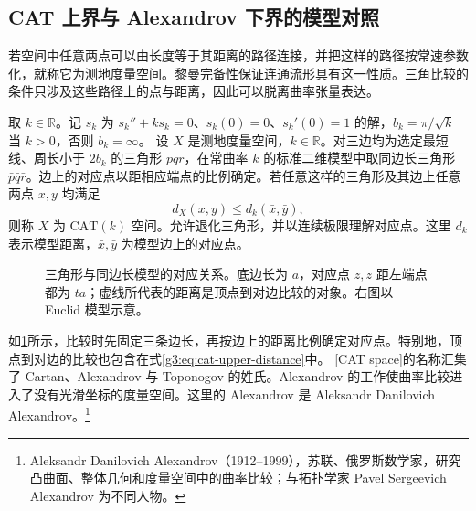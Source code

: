 \subsection{CAT 上界与 Alexandrov 下界的模型对照}
\label{g3:subsec:0904:03}

若空间中任意两点可以由长度等于其距离的路径连接，并把这样的路径按常速参数化，就称它为测地度量空间。黎曼完备性保证连通流形具有这一性质。三角比较的条件只涉及这些路径上的点与距离，因此可以脱离曲率张量表达。

\begin{definition}\label{g3:def:cat-comparison}
	取 \(k\in\mathbb R\)。记 \(s_k\) 为 \(s_k''+ks_k=0\)、\(s_k(0)=0\)、\(s_k'(0)=1\) 的解，\(b_k=\pi/\sqrt k\) 当 \(k>0\)，否则 \(b_k=\infty\)。
	设 \(X\) 是测地度量空间，\(k\in\mathbb R\)。对三边均为选定最短线、周长小于 \(2b_k\) 的三角形 \(pqr\)，在常曲率 \(k\) 的标准二维模型中取同边长三角形 \(\bar p\bar q\bar r\)。边上的对应点以距相应端点的比例确定。若任意这样的三角形及其边上任意两点 \(x,y\) 均满足
	\begin{equation}\label{g3:eq:cat-upper-distance}
		d_X(x,y)\le d_k(\bar x,\bar y),
	\end{equation}
	则称 \(X\) 为 \(\mathrm{CAT}(k)\) 空间。允许退化三角形，并以连续极限理解对应点。这里 \(d_k\) 表示模型距离，\(\bar x,\bar y\) 为模型边上的对应点。
\end{definition}
\begin{figure}[htbp]
	\centering
	
	\caption{三角形与同边长模型的对应关系。底边长为 \(a\)，对应点 \(z,\bar z\) 距左端点都为 \(ta\)；虚线所代表的距离是顶点到对边比较的对象。右图以 Euclid 模型示意。}
	\label{g3:fig:triangle-correspondence}
\end{figure}
如\cref{g3:fig:triangle-correspondence}所示，比较时先固定三条边长，再按边上的距离比例确定对应点。特别地，顶点到对边的比较也包含在式\eqref{g3:eq:cat-upper-distance}中。
[CAT space]的名称汇集了 Cartan、Alexandrov 与 Toponogov 的姓氏。Alexandrov 的工作使曲率比较进入了没有光滑坐标的度量空间。这里的 Alexandrov 是 Aleksandr Danilovich Alexandrov。\footnote{Aleksandr Danilovich Alexandrov（1912--1999），苏联、俄罗斯数学家，研究凸曲面、整体几何和度量空间中的曲率比较；与拓扑学家 Pavel Sergeevich Alexandrov 为不同人物。}

